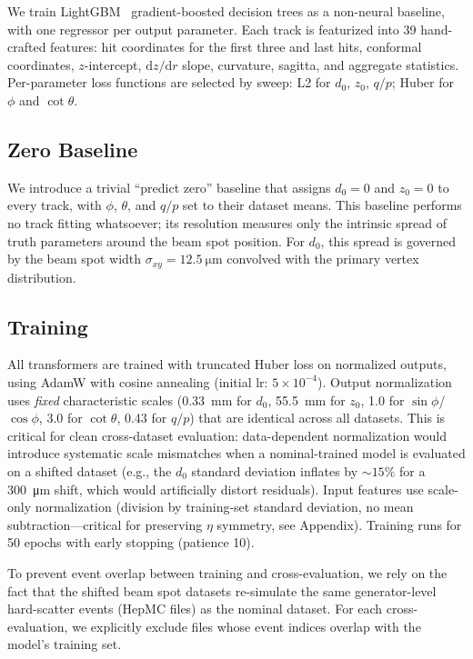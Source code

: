 \documentclass[11pt]{article}
\begin{document}
We train LightGBM~\cite{lightgbm} gradient-boosted decision trees as a non-neural baseline, with one regressor per output parameter.
Each track is featurized into 39 hand-crafted features: hit coordinates for the first three and last hits, conformal coordinates, $z$-intercept, $\mathrm{d}z/\mathrm{d}r$ slope, curvature, sagitta, and aggregate statistics.
Per-parameter loss functions are selected by sweep: L2 for $d_0$, $z_0$, $q/p$; Huber for $\phi$ and $\cot\theta$.

\subsection{Zero Baseline}

We introduce a trivial ``predict zero'' baseline that assigns $d_0 = 0$ and $z_0 = 0$ to every track, with $\phi$, $\theta$, and $q/p$ set to their dataset means.
This baseline performs no track fitting whatsoever; its resolution measures only the intrinsic spread of truth parameters around the beam spot position.
For $d_0$, this spread is governed by the beam spot width $\sigma_{xy} = \SI{12.5}{\micro\metre}$ convolved with the primary vertex distribution.

\subsection{Training}

All transformers are trained with truncated Huber loss on normalized outputs, using AdamW with cosine annealing (initial lr: $5\times10^{-4}$).
Output normalization uses \emph{fixed} characteristic scales (\SI{0.33}{\milli\metre} for $d_0$, \SI{55.5}{\milli\metre} for $z_0$, 1.0 for $\sin\phi$/$\cos\phi$, 3.0 for $\cot\theta$, 0.43 for $q/p$) that are identical across all datasets.
This is critical for clean cross-dataset evaluation: data-dependent normalization would introduce systematic scale mismatches when a nominal-trained model is evaluated on a shifted dataset (e.g., the $d_0$ standard deviation inflates by $\sim 15\%$ for a \SI{300}{\micro\metre} shift, which would artificially distort residuals).
Input features use scale-only normalization (division by training-set standard deviation, no mean subtraction---critical for preserving $\eta$ symmetry, see Appendix).
Training runs for 50 epochs with early stopping (patience 10).

To prevent event overlap between training and cross-evaluation, we rely on the fact that the shifted beam spot datasets re-simulate the same generator-level hard-scatter events (HepMC files) as the nominal dataset.
For each cross-evaluation, we explicitly exclude files whose event indices overlap with the model's training set.
\end{document}
